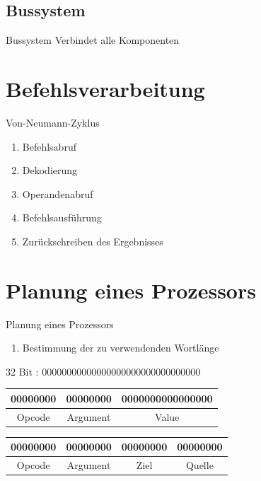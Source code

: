 \documentclass{beamer}
\begin{document}
\subsection{Bussystem}
\begin{frame}[t]{Bussystem}
Verbindet alle Komponenten 
\end{frame}

\section{Befehlsverarbeitung}
\begin{frame}{Von-Neumann-Zyklus}
\begin{enumerate}\pause
\item{Befehlsabruf}\pause
\item{Dekodierung}\pause
\item{Operandenabruf}\pause
\item{Befehlsausf\"uhrung}\pause
\item{Zur\"uckschreiben des Ergebnisses}
\end{enumerate}
\end{frame}

\section{Planung eines Prozessors}

\begin{frame}[t]{Planung eines Prozessors}
\begin{enumerate}
\item{Bestimmung der zu verwendenden Wortl\"ange}
\end{enumerate}
32 Bit : 00000000000000000000000000000000
\centering 
\pause
\begin{table}[]
\centering
\begin{tabular}{|c|c|c|}
\hline
00000000 & 00000000 & 0000000000000000 \\ \hline
Opcode   & Argument & Value            \\ \hline
\end{tabular}
\end{table}
\smallskip
\pause
\centering
\begin{table}[]
\centering
\begin{tabular}{|c|c|c|c|}
\hline
00000000 & 00000000 & 00000000 & 00000000 \\ \hline
Opcode   & Argument & Ziel     & Quelle   \\ \hline
\end{tabular}
\end{table}
\end{frame}
\end{document}
